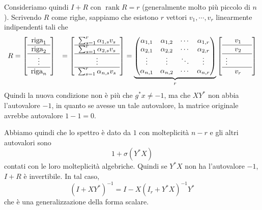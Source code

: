 \documentclass[a4paper]{article}
\begin{document}
Consideriamo quindi \(I + R\)
con \(\operatorname{rank} R = r\) (generalmente molto più piccolo di \(n\)).
Scrivendo \(R\) come righe, sappiamo che esistono \(r\)
vettori \(v_1, \cdots, v_r\) linearmente indipendenti tali che
\begin{align*}
    R &=
    \left[
        \begin{array}{c}
            \text{riga}_1 \\ \hline
            \text{riga}_2 \\ \hline
            \vdots \\ \hline
            \text{riga}_n
        \end{array}
    \right]
    &= \left[
        \begin{array}{c}
            \sum_{s=1}^r \alpha_{1,s} v_s \\ \hline
            \sum_{s=1}^r \alpha_{2,s} v_s \\ \hline
            \vdots \\ \hline
            \sum_{s=1}^r \alpha_{n,s} v_s
        \end{array}
    \right]
    = \underbrace{
        \begin{pmatrix}
            \alpha_{1,1} & \alpha_{1,2} & \cdots & \alpha_{1,r} \\
            \alpha_{2,1} & \alpha_{2,2} & \cdots & \alpha_{2,r} \\
            \vdots & \vdots & \ddots & \vdots \\
            \alpha_{n,1} & \alpha_{n,2} & \cdots & \alpha_{n,r}
        \end{pmatrix}
    }_{r}
    \left[
        \begin{array}{ccc}
            & v_1 & \\ \hline
            & v_2 & \\ \hline
            \vdots \\ \hline
            & v_r &
        \end{array}
    \right]
\end{align*}
Quindi la nuova condizione non è più che \(g^*x \neq -1\),
ma che \(XY^*\) non abbia l'autovalore \(-1\), in quanto se avesse un tale autovalore,
la matrice originale avrebbe autovalore \(1 - 1 = 0\).

Abbiamo quindi che lo spettro è dato da \(1\)
con molteplicità \(n - r\)
e gli altri autovalori sono
\[
    1 + \sigma(Y^*X)
\]
contati con le loro molteplicità algebriche.
Quindi se \(Y^*X\) non ha l'autovalore \(-1\), \(I + R\)
è invertibile. In tal caso,
\[
    (I + XY^*)^{-1}
    = I - X \left(I_r + Y^*X\right)^{-1} Y^*
\]
che è una generalizzazione della forma scalare.
\end{document}
